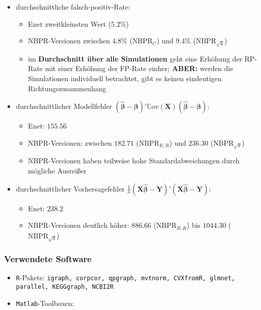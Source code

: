 \documentclass{beamer}
\begin{document}
\begin{frame}
	\begin{itemize}
	\item durchschnittliche falsch-positiv-Rate:
	\begin{itemize}
	\item Enet zweitkleinsten Wert ($5.2\%$)
	\item NBPR-Versionen zwischen $4.8\%$ ($\text{NBPR}_{C}$) und $9.4\%$ ($\text{NBPR}_{\sqrt{d}}$)
	\item im \textbf{Durchschnitt über alle Simulationen} geht eine Erhöhung der RP-Rate mit einer Erhöhung der FP-Rate einher; \textbf{ABER:} werden die Simulationen individuell betrachtet, gibt es keinen eindeutigen Richtungszusammenhang  
	\end{itemize}
	\end{itemize}
\end{frame}


\begin{frame}
	\begin{itemize}
	\item durchschnittlicher Modellfehler $(\boldsymbol{\hat{\beta}}- \boldsymbol{\beta})'\mathbb{C}\text{ov}(\mathbf{X})(\boldsymbol{\hat{\beta}}- \boldsymbol{\beta})$:
	\begin{itemize}
	\item Enet: $155.56$
	\item NBPR-Versionen: zwischen $182.71$ ($\text{NBPR}_{E,R}$) und $236.30$ ($\text{NBPR}_{\sqrt{d}}$)
	\item NBPR-Versionen haben teilweise hohe Standardabweichungen durch mögliche Ausreißer
	\end{itemize}
	\item durchschnittlicher Vorhersagefehler $\frac{1}{n}(\mathbf{X}\boldsymbol{\hat{\beta}}- \mathbf{Y})'(\mathbf{X}\boldsymbol{\hat{\beta}}- \mathbf{Y})$:
	\begin{itemize}
	\item Enet: $238.2$
	\item NBPR-Versionen deutlich höher: $886.66$ ($\text{NBPR}_{B,R}$) bis $1044.30$ ($\text{NBPR}_{\sqrt{d}}$)
	\end{itemize}
	\end{itemize}
\end{frame}


\begin{frame}
	\frametitle{Verwendete Software}
	\begin{itemize}
	\item \texttt{R}-Pakete: \texttt{igraph, corpcor, qpgraph, mvtnorm, CVXfromR, glmnet, parallel, KEGGgraph, NCBI2R}
	\item \texttt{Matlab}-Toolboxen: 
	\end{itemize}
\end{frame}


%
%


%
\end{document}
